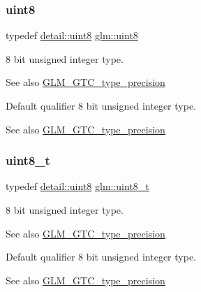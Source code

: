 \subsubsection{\texorpdfstring{uint8}{uint8}}
{\footnotesize\ttfamily typedef \mbox{\hyperlink{namespaceglm_1_1detail_aef2588f97d090cc19fbbe0c74fe17c8f}{detail\+::uint8}} \mbox{\hyperlink{group__gtc__type__precision_ga1a7dcd8aac97cc8020817c94049deff2}{glm\+::uint8}}}

8 bit unsigned integer type. \begin{DoxySeeAlso}{See also}
\mbox{\hyperlink{group__gtc__type__precision}{G\+L\+M\+\_\+\+G\+T\+C\+\_\+type\+\_\+precision}}
\end{DoxySeeAlso}
Default qualifier 8 bit unsigned integer type. \begin{DoxySeeAlso}{See also}
\mbox{\hyperlink{group__gtc__type__precision}{G\+L\+M\+\_\+\+G\+T\+C\+\_\+type\+\_\+precision}} 
\end{DoxySeeAlso}
\mbox{\label{group__gtc__type__precision_ga93adf6dd9803408f3e3aaf9dedda352b}} 
\subsubsection{\texorpdfstring{uint8\+\_\+t}{uint8\_t}}
{\footnotesize\ttfamily typedef \mbox{\hyperlink{namespaceglm_1_1detail_aef2588f97d090cc19fbbe0c74fe17c8f}{detail\+::uint8}} \mbox{\hyperlink{group__gtc__type__precision_ga93adf6dd9803408f3e3aaf9dedda352b}{glm\+::uint8\+\_\+t}}}

8 bit unsigned integer type. \begin{DoxySeeAlso}{See also}
\mbox{\hyperlink{group__gtc__type__precision}{G\+L\+M\+\_\+\+G\+T\+C\+\_\+type\+\_\+precision}}
\end{DoxySeeAlso}
Default qualifier 8 bit unsigned integer type. \begin{DoxySeeAlso}{See also}
\mbox{\hyperlink{group__gtc__type__precision}{G\+L\+M\+\_\+\+G\+T\+C\+\_\+type\+\_\+precision}} 
\end{DoxySeeAlso}
